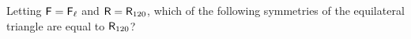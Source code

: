 \documentclass{ximera}
\author{Jenny Sheldon \and Bart Snapp}
\begin{document}
\begin{exercise}
  Letting $\mathsf{F} = \mathsf{F}_{\ell}$ and $\mathsf{R}= \mathsf{R}_{120}$, which of
  the following symmetries of the equilateral triangle are equal to
  $\mathsf{R}_{120}$?
  \begin{selectAll}

  \end{selectAll}
\end{exercise}
\end{document}
